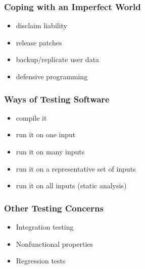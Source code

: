 \documentclass{beamer}
\newenvironment{changemargin}[1]{%
  \begin{list}{}{%
    \setlength{\topsep}{0pt}%
    \setlength{\leftmargin}{#1}%
    \setlength{\rightmargin}{1em}
    \setlength{\listparindent}{\parindent}%
    \setlength{\itemindent}{\parindent}%
    \setlength{\parsep}{\parskip}%
  }%
  \item[]}{\end{list}}
\begin{document}
\begin{frame}
  \frametitle{Coping with an Imperfect World}

  \Large
  \begin{changemargin}{2em}
  
  \begin{itemize}
   \item disclaim liability
   \item release patches
   \item backup/replicate user data
   \item defensive programming
  \end{itemize}
  \end{changemargin}
\end{frame}

\begin{frame}
  \frametitle{Ways of Testing Software}

  \Large
    \begin{changemargin}{2em}

  \begin{itemize}
   \item compile it
   \item<2-> run it on one input 
   \item<3-> run it on many inputs
   \item<4-> run it on a representative set of inputs
   \item<5-> run it on all inputs (static analysis)
  \end{itemize}
    \end{changemargin}

\end{frame}

\begin{frame}
  \frametitle{Other Testing Concerns}

  \begin{changemargin}{2em}
\Large
  \begin{itemize}
  \item Integration testing
  \item Nonfunctional properties
  \item Regression tests
  \end{itemize}
  \end{changemargin}
\end{frame}
\end{document}
